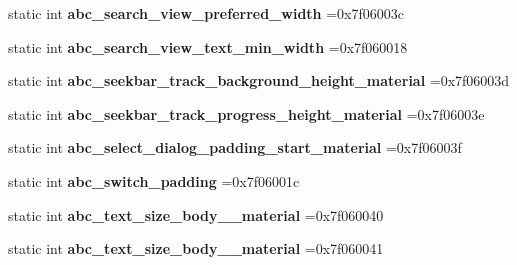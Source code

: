 \begin{DoxyCompactItemize}
static int {\bfseries abc\+\_\+search\+\_\+view\+\_\+preferred\+\_\+width} =0x7f06003c
\item 
\mbox{\label{classandroid_1_1support_1_1v7_1_1cardview_1_1R_1_1dimen_a4e26a8c762c5326afab00247e9729d4c}} 
static int {\bfseries abc\+\_\+search\+\_\+view\+\_\+text\+\_\+min\+\_\+width} =0x7f060018
\item 
\mbox{\label{classandroid_1_1support_1_1v7_1_1cardview_1_1R_1_1dimen_a260a52e589d75cb584a56be283d1805b}} 
static int {\bfseries abc\+\_\+seekbar\+\_\+track\+\_\+background\+\_\+height\+\_\+material} =0x7f06003d
\item 
\mbox{\label{classandroid_1_1support_1_1v7_1_1cardview_1_1R_1_1dimen_ac086b0f794c823099bbcdc6b6c3b647c}} 
static int {\bfseries abc\+\_\+seekbar\+\_\+track\+\_\+progress\+\_\+height\+\_\+material} =0x7f06003e
\item 
\mbox{\label{classandroid_1_1support_1_1v7_1_1cardview_1_1R_1_1dimen_ab0da70899a87fe80d0c650e264fd2833}} 
static int {\bfseries abc\+\_\+select\+\_\+dialog\+\_\+padding\+\_\+start\+\_\+material} =0x7f06003f
\item 
\mbox{\label{classandroid_1_1support_1_1v7_1_1cardview_1_1R_1_1dimen_ac04b60db47b8d97b6a1abcde3a82bae7}} 
static int {\bfseries abc\+\_\+switch\+\_\+padding} =0x7f06001c
\item 
\mbox{\label{classandroid_1_1support_1_1v7_1_1cardview_1_1R_1_1dimen_a1d32c0c72df807bf03e625a24041f322}} 
static int {\bfseries abc\+\_\+text\+\_\+size\+\_\+body\+\_\+\_\+material} =0x7f060040
\item 
\mbox{\label{classandroid_1_1support_1_1v7_1_1cardview_1_1R_1_1dimen_a484db4555c2ffbca41544dfca4119ead}} 
static int {\bfseries abc\+\_\+text\+\_\+size\+\_\+body\+\_\+\_\+material} =0x7f060041
\item 
\mbox{\label{classandroid_1_1support_1_1v7_1_1cardview_1_1R_1_1dimen_ac3797a712314806ade0db8debf55a2c6}} 

\end{DoxyCompactItemize}
